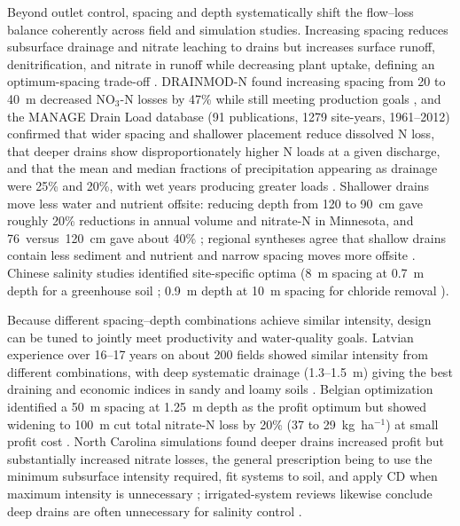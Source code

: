 Beyond outlet control, spacing and depth systematically shift the flow--loss
balance coherently across field and simulation studies. Increasing spacing
reduces subsurface drainage and nitrate leaching to drains but increases surface
runoff, denitrification, and nitrate in runoff while decreasing plant uptake,
defining an optimum-spacing trade-off \parencite{ElSadek2002,ElSadek2002b}.
DRAINMOD-N found increasing spacing from 20 to 40~m decreased NO$_3$-N losses by
47\% while still meeting production goals \parencite{Skaggs1995}, and the MANAGE
Drain Load database (91 publications, 1279 site-years, 1961--2012) confirmed that
wider spacing and shallower placement reduce dissolved N loss, that deeper drains
show disproportionately higher N loads at a given discharge, and that the mean
and median fractions of precipitation appearing as drainage were 25\% and 20\%,
with wet years producing greater loads \parencite{Christianson2015}. Shallower
drains move less water and nutrient offsite: reducing depth from 120 to 90~cm
gave roughly 20\% reductions in annual volume and nitrate-N in Minnesota, and
76~versus~120~cm gave about 40\% \parencite{Strock2011}; regional syntheses agree
that shallow drains contain less sediment and nutrient and narrow spacing moves
more offsite \parencite{FAUSEY1995}. Chinese salinity studies identified
site-specific optima (8~m spacing at 0.7~m depth for a greenhouse soil
\parencite{Shao2012}; 0.9~m depth at 10~m spacing for chloride removal
\parencite{Yan2013b}).

Because different spacing--depth combinations achieve similar intensity, design
can be tuned to jointly meet productivity and water-quality goals. Latvian
experience over 16--17 years on about 200 fields showed similar intensity from
different combinations, with deep systematic drainage (1.3--1.5~m) giving the
best draining and economic indices in sandy and loamy soils
\parencite{SHKINKIS1979}. Belgian optimization identified a 50~m spacing at
1.25~m depth as the profit optimum but showed widening to 100~m cut total
nitrate-N loss by 20\% (37 to 29~kg~ha$^{-1}$) at small profit cost
\parencite{ElSadek2002b}. North Carolina simulations found deeper drains
increased profit but substantially increased nitrate losses, the general
prescription being to use the minimum subsurface intensity required, fit systems
to soil, and apply CD when maximum intensity is unnecessary
\parencite{Breve1998}; irrigated-system reviews likewise conclude deep drains are
often unnecessary for salinity control \parencite{Ritzema2011}.

